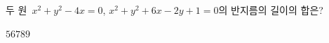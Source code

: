 두 원~$x^2+y^2-4x=0$, $x^2+y^2+6x-2y+1=0$의 반지름의 길이의 합은?
\begin{choices32}{$5$}{$6$}{$7$}{$8$}{$9$}\end{choices32}

